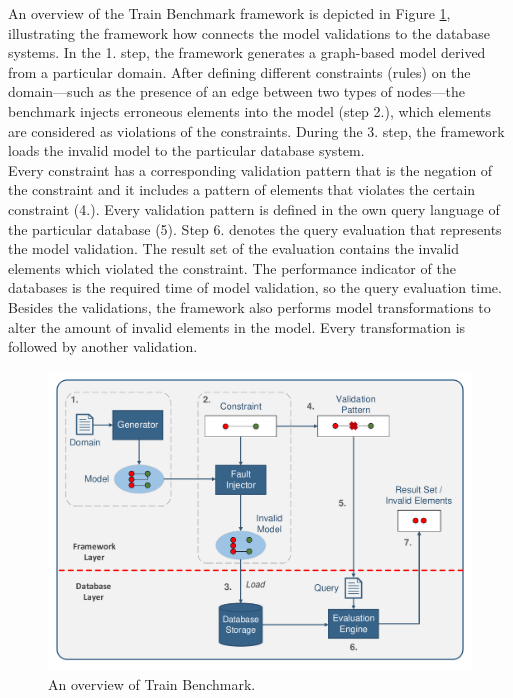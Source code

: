 An overview of the Train Benchmark framework is depicted in Figure \ref{fig:overview_train}, illustrating the framework how connects the model validations to the database systems. In the 1. step, the framework generates a graph-based model derived from a particular domain. After defining different constraints (rules) on the domain---such as the presence of an edge between two types of nodes---the benchmark injects erroneous elements into the model (step 2.), which elements are considered as violations of the constraints. During the 3. step, the framework loads the invalid model to the particular database system.\\
Every constraint has a corresponding validation pattern that is the negation of the constraint and it includes a pattern of elements that violates the certain constraint (4.). Every validation pattern is defined in the own query language of the particular database (5). Step 6. denotes the query evaluation that represents the model validation. The result set of the evaluation contains the invalid elements which violated the constraint. The performance indicator of the databases is the required time of model validation, so the query evaluation time.\\
Besides the validations, the framework also performs model transformations to alter the amount of invalid elements in the model. Every transformation is followed by another validation.

\begin{figure}[!ht]
	\centering
	\includegraphics[width=150mm, keepaspectratio]{figures/functionality.pdf}
	\caption{An overview of Train Benchmark.}
	\label{fig:overview_train}
\end{figure}

